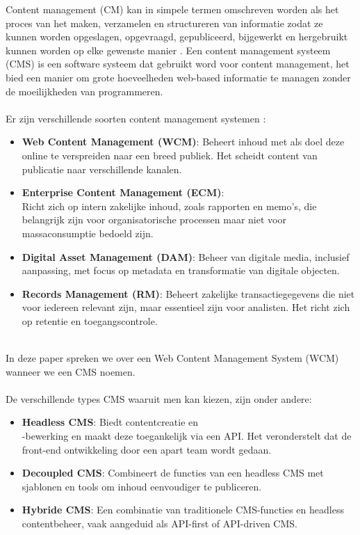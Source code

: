 
Content management (CM) kan in simpele termen omschreven worden als het proces van het maken, verzamelen en structureren van informatie zodat ze kunnen worden opgeslagen, opgevraagd, gepubliceerd, bijgewerkt en hergebruikt kunnen worden op elke gewenste manier \autocite{Sunny2008}. Een content management systeem (CMS) is een software systeem dat gebruikt word voor content management, het bied een manier om grote hoeveelheden web-based informatie te managen zonder de moeilijkheden van programmeren.
\\ \\
Er zijn verschillende soorten content management systemen \autocite{Singh2023}:
\begin{itemize}
    \item \textbf{Web Content Management (WCM)}: Beheert inhoud met als doel deze online te verspreiden naar een breed publiek. Het scheidt content van publicatie naar verschillende kanalen.
    \item \textbf{Enterprise Content Management (ECM)}:\\Richt zich op intern zakelijke inhoud, zoals rapporten en memo’s, die belangrijk zijn voor organisatorische processen maar niet voor massaconsumptie bedoeld zijn.
    \item \textbf{Digital Asset Management (DAM)}: Beheer van digitale media, inclusief aanpassing, met focus op metadata en transformatie van digitale objecten.
    \item \textbf{Records Management (RM)}: Beheert zakelijke transactiegegevens die niet voor iedereen relevant zijn, maar essentieel zijn voor analisten. Het richt zich op retentie en toegangscontrole.
\end{itemize}
\\
In deze paper spreken we over een Web Content Management System (WCM) wanneer we een CMS noemen.
\\ \\
De verschillende types CMS waaruit men kan kiezen, zijn onder andere:
\begin{itemize}
    \item \textbf{Headless CMS}: Biedt contentcreatie en\\-bewerking en maakt deze toegankelijk via een API. Het veronderstelt dat de front-end ontwikkeling door een apart team wordt gedaan.
    \item \textbf{Decoupled CMS}: Combineert de functies van een headless CMS met sjablonen en tools om inhoud eenvoudiger te publiceren.
    \item \textbf{Hybride CMS}: Een combinatie van traditionele CMS-functies en headless contentbeheer, vaak aangeduid als API-first of API-driven CMS.
\end{itemize}
